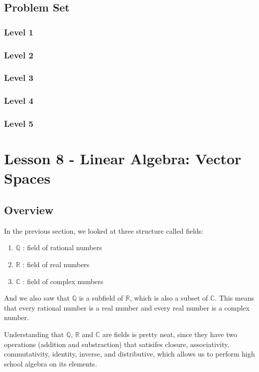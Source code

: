 \documentclass{article}
\begin{document}
\subsection{Problem Set}
\subsubsection{Level 1}
\subsubsection{Level 2}
\subsubsection{Level 3}
\subsubsection{Level 4}
\subsubsection{Level 5}
\pagebreak

\section{Lesson 8 - Linear Algebra: Vector Spaces}
\subsection{Overview}

In the previous section, we looked at three structure called fields:

\begin{enumerate}
    \item $\mathbb{Q}$ : field of rational numbers
    \item $\mathbb{R}$ : field of real numbers
    \item $\mathbb{C}$ : field of complex numbers
\end{enumerate}

And we also saw that $\mathbb{Q}$ is a subfield of $\mathbb{R}$, which is also
a subset of $\mathbb{C}$. This means that every rational number is a real number
and every real number is a complex number.

Understanding that $\mathbb{Q}$, $\mathbb{R}$ and $\mathbb{C}$ are fields is pretty
neat, since they have two operations (addition and substraction) that satisifes
closure, associativity, commutativity, identity, inverse, and distributive,
which allows us to perform high school algebra on its elements.
\end{document}
